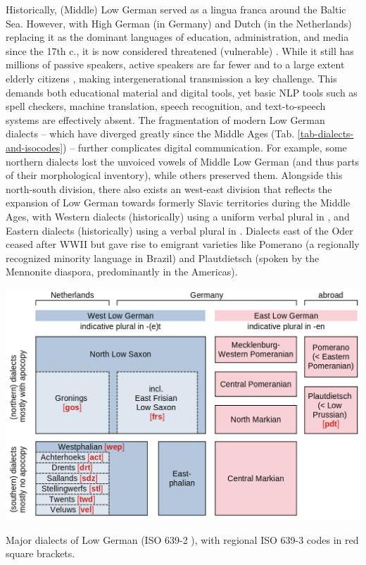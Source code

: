 Historically, (Middle) Low German served as a lingua franca around the Baltic Sea. However, with High German (in Germany) and Dutch (in the Netherlands) replacing it as the dominant languages of education, administration, and media since the 17th c., it is now considered threatened (vulnerable) \cite[p.25]{moseley2010atlas}. While it still has millions of passive speakers, active speakers are far fewer and to a large extent elderly citizens \cite{AdlerEhlersGoltzetal.2019}, making intergenerational transmission a key challenge. This demands both educational material and digital tools, yet basic NLP tools such as spell checkers, machine translation, speech recognition, and text-to-speech systems are effectively absent. The fragmentation of modern Low German dialects -- which have diverged greatly since the Middle Ages (Tab. \ref{tab-dialects-and-isocodes}) -- further complicates digital communication. For example, some northern dialects lost the unvoiced vowels of Middle Low German (and thus parts of their morphological inventory), while others preserved them. Alongside this north-south division, there also exists an west-east division that reflects the expansion of Low German towards formerly Slavic territories during the Middle Ages, with Western dialects (historically) using a uniform verbal plural in , and Eastern dialects (historically) using a verbal plural in . Dialects east of the Oder ceased after WWII but gave rise to emigrant varieties like Pomerano (a regionally recognized minority language in Brazil) and Plautdietsch (spoken by the Mennonite diaspora, predominantly in the Americas).

\begin{table}
    \centering
    \includegraphics[width=1.0\linewidth]{img/dialects-and-iso632-codes.png}
    \caption{Major dialects of Low German (ISO 639-2 ), with regional ISO 639-3 codes in red square brackets.}
    \label{tab-dialects-and-isocodes}
\end{table}

